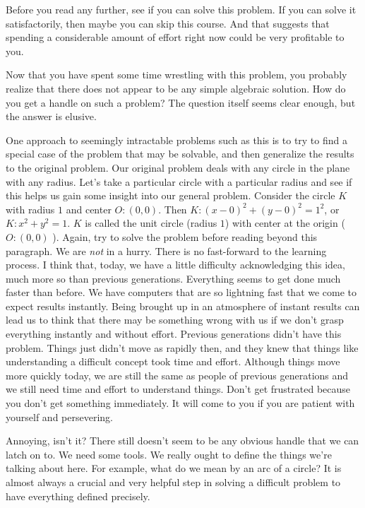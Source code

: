 \documentclass[english]{book}
\begin{document}
Before you read any further, see if you can solve this problem. If you can solve it satisfactorily, then maybe you can skip this course. And that suggests that spending a considerable amount of effort right now could be very profitable to you.

Now that you have spent some time wrestling with this problem, you probably realize that there does not appear to be any simple algebraic solution. How do you get a handle on such a problem? The question itself seems clear enough, but the answer is elusive.

One approach to seemingly intractable problems such as this is to try to find a special case of the problem that may be solvable, and then generalize the results to the original problem. Our original problem deals with any circle in the plane with any radius. Let's take a particular circle with a particular radius and see if this helps us gain some insight into our general problem. Consider the circle $K$ with radius $1$ and center $O: (0,0)$. Then $K: (x-0)^{2} + (y-0)^{2} =1^{2}$, or $K: x^{2} + y^{2} = 1$. $K$ is called the unit circle (radius $1$) with center at the origin ( $O: (0,0)$ ). Again, try to solve the problem before reading beyond this paragraph. We are \emph{not} in a hurry. There is no fast-forward to the learning process. I think that, today, we have a little difficulty acknowledging this idea, much more so than previous generations. Everything seems to get done much faster than before. We have computers that are so lightning fast that we come to expect results instantly. Being brought up in an atmosphere of instant results can lead us to think that there may be something wrong with us if we don't grasp everything instantly and without effort. Previous generations didn't have this problem. Things just didn't move as rapidly then, and they knew that things like understanding a difficult concept took time and effort. Although things move more quickly today, we are still the same as people of previous generations and we still need time and effort to understand things. Don't get frustrated because you don't get something immediately. It will come to you if you are patient with yourself and persevering.

Annoying, isn't it? There still doesn't seem to be any obvious handle that we can latch on to. We need some tools. We really ought to define the things we're talking about here. For example, what do we mean by an arc of a circle? It is almost always a crucial and very helpful step in solving a difficult problem to have everything defined precisely.
\end{document}
